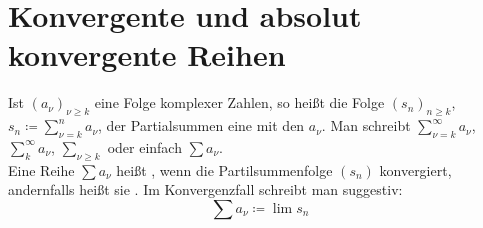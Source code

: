 \chapter{Konvergente und absolut konvergente Reihen}
\begin{definition}
Ist $ (a_\nu)_{\nu\geq k} $ eine Folge komplexer Zahlen, so hei\ss t die Folge $ (s_n)_{n\geq k} $, $ s_n\coloneqq\sum_{\nu=k}^{n}a_\nu $, der Partialsummen eine  mit den  $ a_\nu $. Man schreibt $ \sum_{\nu=k}^{\infty}a_\nu $, $ \sum_{k}^{\infty}a_\nu $, $ \sum_{\nu\geq k} $ oder einfach $ \sum a_\nu $.\\
 Eine Reihe $ \sum a_\nu $ hei\ss t , wenn die Partilsummenfolge $ (s_n) $ konvergiert, andernfalls hei\ss t sie . Im Konvergenzfall schreibt man suggestiv:
\[ \sum a_\nu\coloneqq\lim s_n \]
\end{definition}